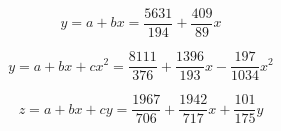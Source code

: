 \documentclass[10pt]{article}
\begin{document}
\begin{enumerate}[leftmargin=\labelsep]
\begin{figure}[h]
\begin{minipage}[c]{0.48\linewidth}
        \end{minipage}%
    \end{figure}

    \begin{equation}
        y = a + bx = \frac{5631}{194} + \frac{409}{89}x
    \end{equation}

    \begin{equation}
        y = a + bx + cx^2 = \frac{8111}{376} + \frac{1396}{193}x - \frac{197}{1034}x^2
    \end{equation}

    \begin{equation}
        z = a + bx + cy = \frac{1967}{706} + \frac{1942}{717}x + \frac{101}{175}y
    \end{equation}
    
\end{enumerate}
\end{document}
